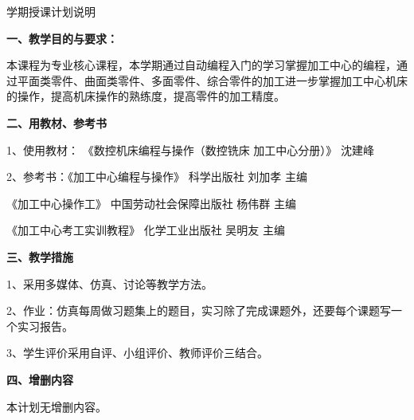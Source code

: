 \documentclass{ctexart}
\begin{document}
\kh{[3]} %

\jhsy %

\begin{center}
 \heiti 学期授课计划说明
\end{center}
 \setlength{\parindent}{2em} \setlength{\baselineskip}{22pt}

\textbf{一、教学目的与要求：}

本课程为专业核心课程，本学期通过自动编程入门的学习掌握加工中心的编程，通过平面类零件、曲面类零件、多面零件、综合零件的加工进一步掌握加工中心机床的操作，提高机床操作的熟练度，提高零件的加工精度。

\textbf{二、用教材、参考书}

1、使用教材： 《数控机床编程与操作（数控铣床 加工中心分册）》 沈建峰

2、参考书：《加工中心编程与操作》  科学出版社  刘加孝   主编

\hspace{5em}《加工中心操作工》 中国劳动社会保障出版社  杨伟群  主编

\hspace{5em}《加工中心考工实训教程》  化学工业出版社   吴明友 主编

\textbf{三、教学措施}

1、采用多媒体、仿真、讨论等教学方法。

2、作业：仿真每周做习题集上的题目，实习除了完成课题外，还要每个课题写一个实习报告。

3、学生评价采用自评、小组评价、教师评价三结合。


\textbf{四、增删内容}

本计划无增删内容。
\end{document}
